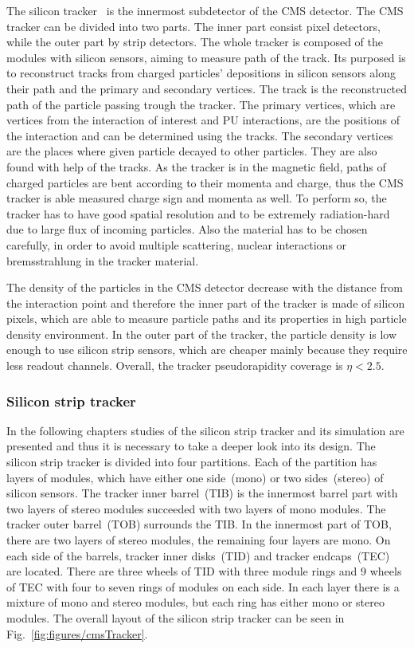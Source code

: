 The silicon tracker~\cite{CMS:1997tlf, CMS:2000eqx} is the innermost subdetector of the CMS detector. The CMS tracker can be divided into two parts. The inner part consist pixel detectors, while the outer part by strip detectors. The whole tracker is composed of the modules with silicon sensors, aiming to measure path of the track. Its purposed is to reconstruct tracks from charged particles' depositions in silicon sensors along their path and the primary and secondary vertices. The track is the reconstructed path of the particle passing trough the tracker. The primary vertices, which are vertices from the interaction of interest and PU interactions, are the positions of the interaction and can be determined using the tracks. The secondary vertices are the places where given particle decayed to other particles. They are also found with help of the tracks. As the tracker is in the magnetic field, paths of charged particles are bent according to their momenta and charge, thus the CMS tracker is able measured charge sign and momenta as well. To perform so, the tracker has to have good spatial resolution and to be extremely radiation-hard due to large flux of incoming particles. Also the material has to be chosen carefully, in order to avoid multiple scattering, nuclear interactions or bremsstrahlung in the tracker material.

The density of the particles in the CMS detector decrease with the distance from the interaction point and therefore the inner part of the tracker is made of silicon pixels, which are able to measure particle paths and its properties in high particle density environment. In the outer part of the tracker, the particle density is low enough to use silicon strip sensors, which are cheaper mainly because they require less readout channels. Overall, the tracker pseudorapidity coverage is  $\eta < 2.5$.

\subsubsection{Silicon strip tracker}

In the following chapters studies of the silicon strip tracker and its simulation are presented and thus it is necessary to take a deeper look into its design. The silicon strip tracker is divided into four partitions. Each of the partition has layers of modules, which have either one side~(mono) or two sides~(stereo) of silicon sensors. The tracker inner barrel~(TIB) is the innermost barrel part with two layers of stereo modules succeeded with two layers of mono modules. The tracker outer barrel~(TOB) surrounds the TIB. In the innermost part of TOB, there are two layers of stereo modules, the remaining four layers are mono. On each side of the barrels, tracker inner disks~(TID) and tracker endcaps~(TEC) are located. There are three wheels of TID with three module rings and 9 wheels of TEC with four to seven rings of modules on each side. In each layer there is a mixture of mono and stereo modules, but each ring has either mono or stereo modules. The overall layout of the silicon strip tracker can be seen in Fig.~\ref{fig:figures/cmsTracker}.

